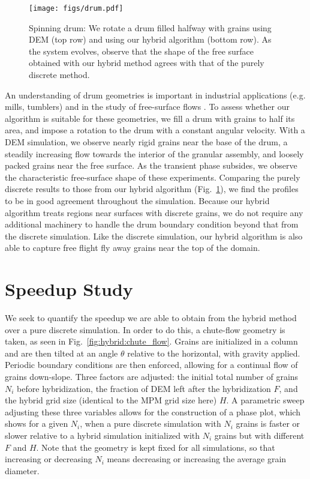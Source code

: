 \begin{figure}
  \centering
  \texttt{[image: figs/drum.pdf]}
  \caption{
    Spinning drum: We rotate a drum filled halfway with grains using DEM (top row) and using our
    hybrid algorithm (bottom row). As the system evolves, observe that the shape of the free surface obtained with our
    hybrid method agrees with that of the purely discrete method.
  }
  \label{fig:hybrid:spinning_drum}
\end{figure}

An understanding of drum geometries is important in industrial applications (e.g. mills,
tumblers) and in the study of free-surface flows \cite{Midi:2004:Dense}. To assess whether our algorithm is
suitable for these geometries, we fill a drum with grains to half its area, and impose a rotation to the drum with
a constant angular velocity. With a DEM simulation, we observe nearly rigid grains near the base of the
drum, a steadily increasing flow towards the interior of the granular assembly, and loosely packed grains near the free
surface. As the transient phase subsides, we observe the characteristic free-surface shape of these experiments.
Comparing the purely discrete results to those from our hybrid algorithm (Fig.~\ref{fig:hybrid:spinning_drum}), we find
the profiles to be in good agreement throughout the simulation. Because our hybrid algorithm treats
regions near surfaces with discrete grains, we do not require any additional machinery to handle the drum boundary
condition beyond that from the discrete simulation. Like the discrete simulation, our hybrid algorithm is also able to
capture free flight fly away grains near the top of the domain.

\section{Speedup Study}
We seek to quantify the speedup we are able to obtain from the hybrid
method over a pure discrete simulation. In order to do this, a chute-flow geometry is taken, as seen in
Fig.~\ref{fig:hybrid:chute_flow}. Grains are initialized in a column and are then tilted at an angle $\theta$ relative
to the horizontal, with gravity applied. Periodic boundary conditions are then enforced, allowing for a continual 
flow of grains down-slope. Three factors are adjusted: the initial total number of grains $N_i$ before hybridization, the fraction of DEM left
after the hybridization $F$, and the hybrid grid size (identical to the MPM grid size here) $H$. A parametric sweep
adjusting these three variables allows for the construction of a phase plot, which shows for a given $N_i$, when a 
pure discrete simulation with $N_i$ grains is faster or slower relative to a hybrid simulation initialized with $N_i$ grains but with
different $F$ and $H$. Note that the geometry is kept fixed for all simulations, so that increasing or decreasing $N_i$ means
decreasing or increasing the average grain diameter.

